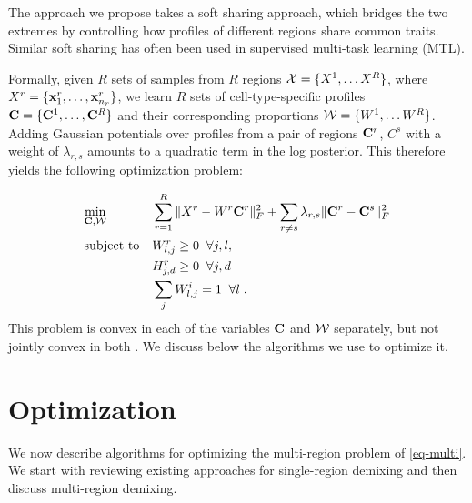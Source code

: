 The approach we propose takes a soft sharing approach, which bridges the two extremes by controlling how profiles of different regions share common traits. Similar soft sharing has often been used in supervised multi-task learning (MTL).


Formally, given $R$ sets of samples from $R$ regions ${\cal{X}} = \{X^1,\ldots X^R\}$, where $X^r = \{\mathbf{x}^r_1, \ldots, \mathbf{x}^r_{n_r} \}$, we learn $R$ sets of cell-type-specific profiles ${\cal{\mathbf{C}}} = \{\mathbf{C}^1,\ldots, \mathbf{C}^R\}$ and their corresponding proportions ${\cal{W}} = \{ W^1,\ldots W^R\}$. Adding Gaussian potentials over profiles from a pair of regions $\mathbf{C}^r$, $C^s$ with a weight of $\lambda_{r,s}$ amounts to a quadratic term in the log posterior. This therefore yields the following optimization problem: 

\begin{equation}
    \label{eq-multi}
    \begin{aligned}
        & \underset{\cal{\mathbf{C}},\cal{W}}{\text{min}}  
        & & \sum_{r=1}^R  \| X^r - W^r \mathbf{C}^r \|_F^2+ \sum_{r \neq s}
   \lambda_{r , s} \| \mathbf{C}^r - \mathbf{C}^s \|_F^2  \\
        & \text{subject to} &
            & W^r_{l,j} \geq 0 \;\; \forall j, l, \\
        & & & H^r_{j,d} \geq 0 \;\;\forall j, d \\
        & & & \sum_j W^i_{l,j} = 1 \;\; \forall l \;. 
    \end{aligned}
\end{equation}
This problem is convex in each of the variables $\cal{\mathbf{C}}$ and $\cal{W}$ separately, but not jointly convex in both . We discuss below the algorithms we use to optimize it.


\section{Optimization}
We now describe algorithms for optimizing the multi-region problem of \eqref{eq-multi}. We start with reviewing existing approaches for single-region demixing and then discuss multi-region demixing. 



